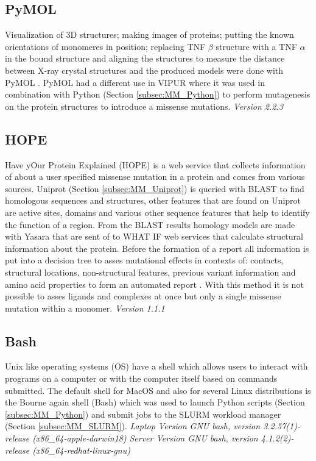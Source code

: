 \subsection{PyMOL}
Visualization of 3D structures; making images of proteins; putting the known orientations of monomeres in position; replacing TNF $\beta$ structure with a TNF $\alpha$ in the bound structure and aligning the structures to measure the distance between X-ray crystal structures and the produced models were done with PyMOL \cite{}. PyMOL had a different use in VIPUR where it was used in combination with Python (Section \ref{subsec:MM_Python}) to perform mutagenesis on the protein structures to introduce a missense mutations.
\label{subsec:MM_PyMOL}
\newline
\textit{Version 2.2.3}

\subsection{HOPE}
Have yOur Protein Explained (HOPE) is a web service that collects information of about a user specified missense mutation in a protein and comes from various sources. Uniprot (Section \ref{subsec:MM_Uniprot}) is queried with BLAST to find homologous sequences and structures, other features that are found on Uniprot are active sites, domains and various other sequence features that help to identify the function of a region. From the BLAST results homology models are made with Yasara that are sent of to WHAT IF web services that calculate structural information about the protein. Before the formation of a report all information is put into a decision tree to asses mutational effects in contexts of: contacts, structural locations, non-structural features, previous variant information and amino acid properties to form an automated report \cite{}.
With this method it is not possible to asses ligands and complexes at once but only a single missense mutation within a monomer.
\label{subsec:MM_HOPE}
\textit{Version 1.1.1}

\subsection{Bash}
Unix like operating systems (OS) have a shell which allows users to interact with programs on a computer or with the computer itself based on commands submitted.  The default shell for MacOS and also for several Linux distributions is the Bourne again shell (Bash) which was used to launch Python scripts (Section \ref{subsec:MM_Python}) and submit jobs to the SLURM workload manager (Section \ref{subsec:MM_SLURM}). 
\label{subsec:MM_Bash}
\newline
\textit{Laptop Version GNU bash, version 3.2.57(1)-release (x86\_64-apple-darwin18)}
\newline
\textit{Server Version GNU bash, version 4.1.2(2)-release (x86\_64-redhat-linux-gnu)}

